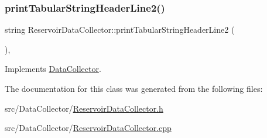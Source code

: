\mbox{\label{classReservoirDataCollector_ae2f8e808c5960608e510a64c7f00ad1b}} 
\subsubsection{\texorpdfstring{print\+Tabular\+String\+Header\+Line2()}{printTabularStringHeaderLine2()}}
{\footnotesize\ttfamily string Reservoir\+Data\+Collector\+::print\+Tabular\+String\+Header\+Line2 (\begin{DoxyParamCaption}{ }\end{DoxyParamCaption})\hspace{0.3cm}{\ttfamily [override]}, {\ttfamily [virtual]}}



Implements \mbox{\hyperlink{classDataCollector_af01ea961314be2164f39e6d4cd59e443}{Data\+Collector}}.



The documentation for this class was generated from the following files\+:\begin{DoxyCompactItemize}
\item 
src/\+Data\+Collector/\mbox{\hyperlink{ReservoirDataCollector_8h}{Reservoir\+Data\+Collector.\+h}}\item 
src/\+Data\+Collector/\mbox{\hyperlink{ReservoirDataCollector_8cpp}{Reservoir\+Data\+Collector.\+cpp}}\end{DoxyCompactItemize}
